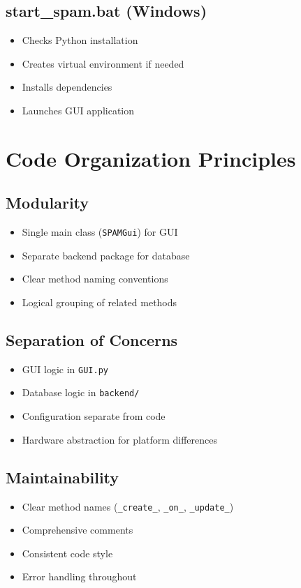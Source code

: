 \documentclass[11pt,a4paper]{article}
\begin{document}
\subsection{start\_spam.bat (Windows)}
\begin{itemize}
    \item Checks Python installation
    \item Creates virtual environment if needed
    \item Installs dependencies
    \item Launches GUI application
\end{itemize}

\section{Code Organization Principles}

\subsection{Modularity}
\begin{itemize}
    \item Single main class (\texttt{SPAMGui}) for GUI
    \item Separate backend package for database
    \item Clear method naming conventions
    \item Logical grouping of related methods
\end{itemize}

\subsection{Separation of Concerns}
\begin{itemize}
    \item GUI logic in \texttt{GUI.py}
    \item Database logic in \texttt{backend/}
    \item Configuration separate from code
    \item Hardware abstraction for platform differences
\end{itemize}

\subsection{Maintainability}
\begin{itemize}
    \item Clear method names (\texttt{\_create\_}, \texttt{\_on\_}, \texttt{\_update\_})
    \item Comprehensive comments
    \item Consistent code style
    \item Error handling throughout
\end{itemize}
\end{document}
